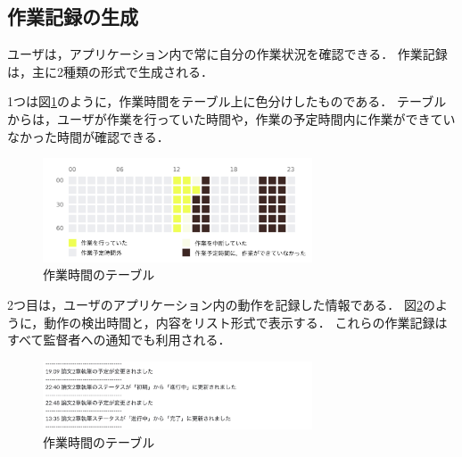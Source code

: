 \subsection{作業記録の生成}
ユーザは，アプリケーション内で常に自分の作業状況を確認できる．
作業記録は，主に2種類の形式で生成される．

1つは図\ref{fig:activity_table}のように，作業時間をテーブル上に色分けしたものである．
テーブルからは，ユーザが作業を行っていた時間や，作業の予定時間内に作業ができていなかった時間が確認できる．

\begin{figure}[h]
  \begin{center}
  \includegraphics[width=8.0cm]{../graphics/activity_table.png}
  \caption{作業時間のテーブル}
  \label{fig:activity_table}
  \end{center}
\end{figure}

2つ目は，ユーザのアプリケーション内の動作を記録した情報である．
図\ref{fig:activity_log}のように，動作の検出時間と，内容をリスト形式で表示する．
これらの作業記録はすべて監督者への通知でも利用される．

\begin{figure}[h]
  \begin{center}
  \includegraphics[width=8.0cm]{../graphics/activity_log.png}
  \caption{作業時間のテーブル}
  \label{fig:activity_log}
  \end{center}
\end{figure}
